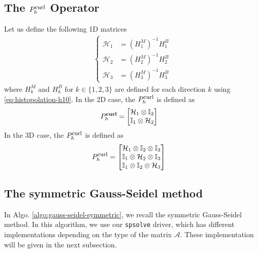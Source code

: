 \subsection{The $P_h^{\mbox{\footnotesize{curl}}}$ Operator}
Let us define the following 1D matrices 
\begin{align}
  \begin{cases}
    \mathcal{H}_1 &= \left( H^{M}_1 \right)^{-1} H^{B}_1 \\ 
    \mathcal{H}_2 &= \left( H^{M}_2 \right)^{-1} H^{B}_2 \\ 
    \mathcal{H}_3 &= \left( H^{M}_3 \right)^{-1} H^{B}_3 
  \end{cases}
\end{align}
where $H^{M}_k$ and  $ H^{B}_k$ for $k \in \{1,2,3\}$ are defined for each direction $k$ using \ref{eq:histopolation-h10}.
In the 2D case, the $P_h^{\mbox{\footnotesize{curl}}}$ is defined as 
\begin{align}
  P_h^{\textbf{curl}} &=
  \begin{bmatrix}
      \mathcal{H}_1 \otimes \mathbb{I}_2
      \\
      \mathbb{I}_1 \otimes \mathcal{H}_2
  \end{bmatrix}
\end{align}
In the 3D case, the $P_h^{\mbox{\footnotesize{curl}}}$ is defined as 
\begin{align}
    P_h^{\mbox{\footnotesize{curl}}}  & = 
    \begin{bmatrix}
      \mathcal{H}_1 \otimes \mathbb{I}_2 \otimes \mathbb{I}_3
      \\
      \mathbb{I}_1 \otimes \mathcal{H}_2 \otimes \mathbb{I}_3 
      \\
      \mathbb{I}_1 \otimes \mathbb{I}_2 \otimes \mathcal{H}_3 
    \end{bmatrix}
  \label{eq:commuting-projectors-splines-3d}
\end{align}
\newpage
\subsection{The symmetric Gauss-Seidel method}
In Algo. \ref{algo:gauss-seidel-symmetric}, we recall the symmetric Gauss-Seidel method. In this algorithm, we use our \texttt{spsolve} driver, which has different implementations depending on the type of the matrix $\mathcal{A}$. These implementation will be given in the next subsection.

